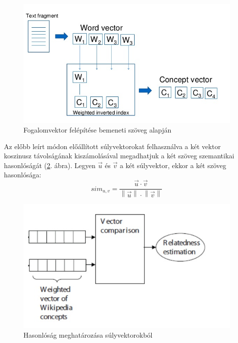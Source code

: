 \begin{figure}[ht]
	\includegraphics[scale=0.3]{images/textfragment}
	\caption{Fogalomvektor felépítése bemeneti szöveg alapján}
	\label{fig:textfragment}
\end{figure}	

Az előbb leírt módon előállított súlyvektorokat felhasználva a két vektor koszinusz távolságának kiszámolásával megadhatjuk a két szöveg szemantikai hasonlóságát (\ref{fig:similarity}. ábra). Legyen $\overrightarrow{u}$ és $\overrightarrow{v}$ a két súlyvektor, ekkor a két szöveg hasonlósága: 
\begin{equation}
	sim_{u,v} = \frac{\overrightarrow{u} \cdot \overrightarrow{v}}{\left\lVert \overrightarrow{u} \right\rVert \cdot \left\lVert \overrightarrow{v} \right\rVert}
\end{equation}

\begin{figure}[ht]
	\includegraphics[scale=0.3]{images/similarity}
	\caption{Hasonlóság meghatározása súlyvektorokból}
	\label{fig:similarity}
\end{figure}	

